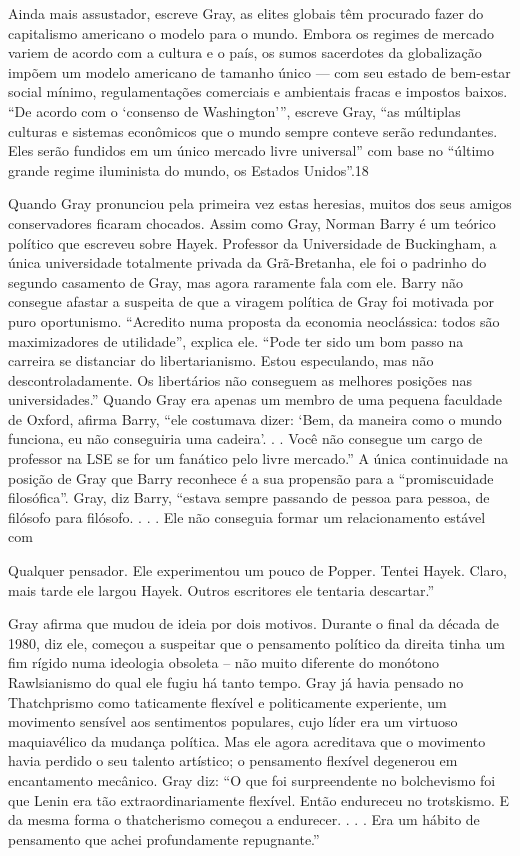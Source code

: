  \par 
Ainda mais assustador, escreve Gray, as elites globais têm procurado fazer do capitalismo americano o modelo para o mundo. Embora os regimes de mercado variem de acordo com a cultura e o país, os sumos sacerdotes da globalização impõem um modelo americano de tamanho único — com seu estado de bem-estar social mínimo, regulamentações comerciais e ambientais fracas e impostos baixos. “De acordo com o ‘consenso de Washington’”, escreve Gray, “as múltiplas culturas e sistemas econômicos que o mundo sempre conteve serão redundantes. Eles serão fundidos em um único mercado livre universal” com base no “último grande regime iluminista do mundo, os Estados Unidos”.{\color{blue}18}
 \par 
Quando Gray pronunciou pela primeira vez estas heresias, muitos dos seus amigos conservadores ficaram chocados. Assim como Gray, Norman Barry é um teórico político que escreveu sobre Hayek. Professor da Universidade de Buckingham, a única universidade totalmente privada da Grã-Bretanha, ele foi o padrinho do segundo casamento de Gray, mas agora raramente fala com ele. Barry não consegue afastar a suspeita de que a viragem política de Gray foi motivada por puro oportunismo. “Acredito numa proposta da economia neoclássica: todos são maximizadores de utilidade”, explica ele. “Pode ter sido um bom passo na carreira se distanciar do libertarianismo. Estou especulando, mas não descontroladamente. Os libertários não conseguem as melhores posições nas universidades.” Quando Gray era apenas um membro de uma pequena faculdade de Oxford, afirma Barry, “ele costumava dizer: ‘Bem, da maneira como o mundo funciona, eu não conseguiria uma cadeira’. . . Você não consegue um cargo de professor na LSE se for um fanático pelo livre mercado.” A única continuidade na posição de Gray que Barry reconhece é a sua propensão para a “promiscuidade filosófica”. Gray, diz Barry, “estava sempre passando de pessoa para pessoa, de filósofo para filósofo. . . . Ele não conseguia formar um relacionamento estável com
 \par 
Qualquer pensador. Ele experimentou um pouco de Popper. Tentei Hayek. Claro, mais tarde ele largou Hayek. Outros escritores ele tentaria descartar.”
 \par 
Gray afirma que mudou de ideia por dois motivos. Durante o final da década de 1980, diz ele, começou a suspeitar que o pensamento político da direita tinha um fim rígido numa ideologia obsoleta – não muito diferente do monótono Rawlsianismo do qual ele fugiu há tanto tempo. Gray já havia pensado no Thatchprismo como taticamente flexível e politicamente experiente, um movimento sensível aos sentimentos populares, cujo líder era um virtuoso maquiavélico da mudança política. Mas ele agora acreditava que o movimento havia perdido o seu talento artístico; o pensamento flexível degenerou em encantamento mecânico. Gray diz: “O que foi surpreendente no bolchevismo foi que Lenin era tão extraordinariamente flexível. Então endureceu no trotskismo. E da mesma forma o thatcherismo começou a endurecer. . . . Era um hábito de pensamento que achei profundamente repugnante.”
